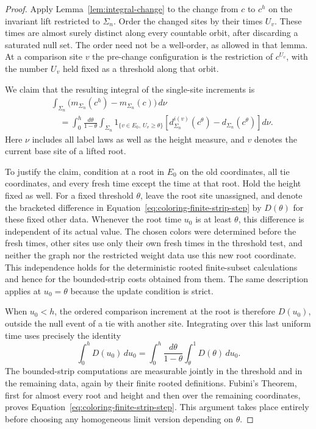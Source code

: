 \begin{proof}
Apply Lemma~\ref{lem:integral-change} to the change from $c$ to $c^h$ on
the invariant lift restricted to $\Sigma_n$.  Order the changed sites by
their times $U_v$.  These times are almost surely distinct along every
countable orbit, after discarding a saturated null set.  The order need
not be a well-order, as allowed in that lemma.  At a comparison site $v$
the pre-change configuration is the restriction of $c^{U_v}$, with the
number $U_v$ held fixed as a threshold along that orbit.

We claim that the resulting integral of the single-site increments is
\begin{equation}
 \begin{split}
 &\int_{\Sigma_n}
       \bigl(m_{\Sigma_n}(c^h)-m_{\Sigma_n}(c)\bigr)\,d\nu\\
 &\quad=\int_0^h\frac{d\theta}{1-\theta}
       \int_{\Sigma_n}1_{\{v\in E_0,\ U_v\geq\theta\}}
       \left[
        d_{\Sigma_n}^{i(v)}(c^\theta)
                         -d_{\Sigma_n}(c^\theta)
       \right]d\nu.
 \end{split}
 \label{eq:coloring-finite-strip-step}
\end{equation}
Here $\nu$ includes all label laws as well as the height measure, and $v$
denotes the current base site of a lifted root.

To justify the claim, condition at a root in $E_0$ on the old coordinates, all tie
coordinates, and every fresh time except the time at that root.  Hold
the height fixed as well.  For a fixed threshold $\theta$, leave the root
site unassigned, and denote the bracketed difference in
Equation~\eqref{eq:coloring-finite-strip-step} by $D(\theta)$ for these
fixed other data.  Whenever the root time $u_0$ is at least $\theta$,
this difference is independent of its actual value.  The chosen colors
were determined before the fresh times, other sites use only their own
fresh times in the threshold test, and neither the graph nor the
restricted weight data use this new root coordinate.  This independence
holds for the deterministic rooted finite-subset calculations and hence
for the bounded-strip costs obtained from them.  The same description
applies at $u_0=\theta$ because the update condition is strict.

When $u_0<h$, the ordered comparison increment at the root is therefore
$D(u_0)$, outside the null event of a tie with another site.  Integrating
over this last uniform time uses precisely the identity
\[
 \int_0^h D(u_0)\,du_0
   =\int_0^h\frac{d\theta}{1-\theta}
                     \int_\theta^1 D(\theta)\,du_0.
\]
The bounded-strip computations are measurable jointly in the threshold
and in the remaining data, again by their finite rooted definitions.
Fubini's Theorem, first for almost every root and height and then over
the remaining coordinates, proves
Equation~\eqref{eq:coloring-finite-strip-step}.  This argument takes place
entirely before choosing any homogeneous limit version depending on
$\theta$.


\end{proof}
